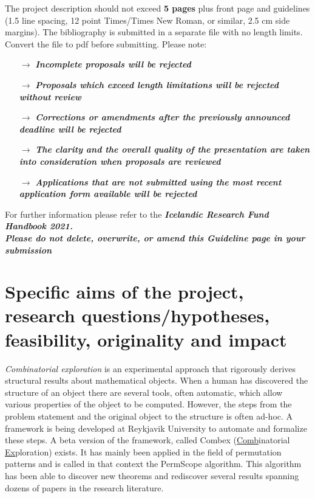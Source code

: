\documentclass{rannis}
\newcommand{\motheralg}{\textsf{Combex}}
\newcommand{\explofmothername}{\underline{Comb}inatorial \underline{Ex}ploration}
\newcommand{\tilealg}{\textsf{PermScope}}
\theoremstyle{definition}
\begin{document}
\noindent
The project description should not exceed \textbf{5 pages} plus
front page and guidelines (1.5 line spacing, 12 point Times/Times New
Roman, or similar, 2.5 cm side margins). The \mbox{bibliography} is submitted
in a separate file with no length limits. Convert the file to pdf before submitting. Please note:

\begin{itemize}
\setlength\itemsep{-0.5em}
\item[$\rightarrow$]
  \emph{\textbf{Incomplete proposals will be rejected}}
\item[$\rightarrow$]
  \emph{\textbf{Proposals which exceed length limitations will be
  rejected without review}}
\item[$\rightarrow$]
  \emph{\textbf{Corrections or amendments after the previously announced
  deadline will be rejected}}
\item[$\rightarrow$]
  \emph{\textbf{The clarity and the overall quality of the presentation
  are taken into consideration when proposals are reviewed}}
\item[$\rightarrow$]
  \emph{\textbf{Applications that are not submitted using the most
  recent application form available will be rejected}}\\
\end{itemize}

\noindent
For further information please refer to the \emph{\textbf{Icelandic
Research Fund Handbook 2021.}}\\

\emph{\textbf{Please do not delete, overwrite, or amend this Guideline
page in your submission\\
}}

\newpage

\section{Specific aims of the project, research questions/hypotheses, feasibility, originality and impact}

\emph{Combinatorial exploration} is an experimental approach that
rigorously derives structural results about mathematical objects.
When a human has discovered the structure of an object there
are several tools, often automatic, which allow various properties of the object
to be computed. However, the steps from the problem statement and the original
object to the structure is often ad-hoc.
A framework is being developed at Reykjavik University to automate and formalize
these steps.
A beta version of the framework, called
\motheralg{} (\explofmothername) exists. It has mainly been applied in
the field of permutation patterns and is called in that context the
\tilealg{} algorithm. This algorithm has been able
to discover new theorems and rediscover several results
spanning dozens of papers in the research literature.
\end{document}
